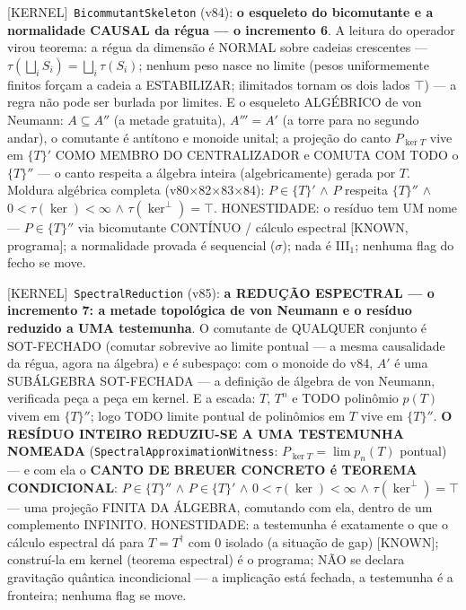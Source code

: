 \documentclass[11pt]{article}
\providecommand{\kernelmk}[1]{\textsf{[KERNEL]}~\texttt{#1}}\providecommand{\knownmk}[1]{\textsf{[KNOWN]}~{#1}}\providecommand{\statusmk}[1]{\textsf{[#1]}}
\theoremstyle{definition}\newtheorem{deriv}{Derivação}
\begin{document}
\kernelmk{BicommutantSkeleton} (v84): \textbf{o esqueleto do bicomutante e a normalidade CAUSAL da régua --- o incremento 6}. A leitura do operador virou teorema: a régua da dimensão é NORMAL sobre cadeias crescentes --- $\tau(\bigsqcup_i S_i)=\bigsqcup_i\tau(S_i)$; nenhum peso nasce no limite (pesos uniformemente finitos forçam a cadeia a ESTABILIZAR; ilimitados tornam os dois lados $\top$) --- a regra não pode ser burlada por limites. E o esqueleto ALGÉBRICO de von Neumann: $A\subseteq A''$ (a metade gratuita), $A'''=A'$ (a torre para no segundo andar), o comutante é antítono e monoide unital; a projeção do canto $P_{\ker T}$ vive em $\{T\}'$ COMO MEMBRO DO CENTRALIZADOR e COMUTA COM TODO o $\{T\}''$ --- o canto respeita a álgebra inteira (algebricamente) gerada por $T$. Moldura algébrica completa (v80$\times$82$\times$83$\times$84): $P\in\{T\}'$ $\wedge$ $P$ respeita $\{T\}''$ $\wedge$ $0<\tau(\ker)<\infty$ $\wedge$ $\tau(\ker^\perp)=\top$. HONESTIDADE: o resíduo tem UM nome --- $P\in\{T\}''$ via bicomutante CONTÍNUO / cálculo espectral [KNOWN, programa]; a normalidade provada é sequencial ($\sigma$); nada é III$_1$; nenhuma flag do fecho se move.

\kernelmk{SpectralReduction} (v85): \textbf{a REDUÇÃO ESPECTRAL --- o incremento 7: a metade topológica de von Neumann e o resíduo reduzido a UMA testemunha}. O comutante de QUALQUER conjunto é SOT-FECHADO (comutar sobrevive ao limite pontual --- a mesma causalidade da régua, agora na álgebra) e é subespaço: com o monoide do v84, $A'$ é uma SUBÁLGEBRA SOT-FECHADA --- a definição de álgebra de von Neumann, verificada peça a peça em kernel. E a escada: $T$, $T^n$ e TODO polinômio $p(T)$ vivem em $\{T\}''$; logo TODO limite pontual de polinômios em $T$ vive em $\{T\}''$. \textbf{O RESÍDUO INTEIRO REDUZIU-SE A UMA TESTEMUNHA NOMEADA} (\texttt{SpectralApproximationWitness}: $P_{\ker T}=\lim p_n(T)$ pontual) --- e com ela o \textbf{CANTO DE BREUER CONCRETO é TEOREMA CONDICIONAL}: $P\in\{T\}''$ $\wedge$ $P\in\{T\}'$ $\wedge$ $0<\tau(\ker)<\infty$ $\wedge$ $\tau(\ker^\perp)=\top$ --- uma projeção FINITA DA ÁLGEBRA, comutando com ela, dentro de um complemento INFINITO. HONESTIDADE: a testemunha é exatamente o que o cálculo espectral dá para $T=T^\dagger$ com $0$ isolado (a situação de gap) [KNOWN]; construí-la em kernel (teorema espectral) é o programa; NÃO se declara gravitação quântica incondicional --- a implicação está fechada, a testemunha é a fronteira; nenhuma flag se move.
\end{document}
